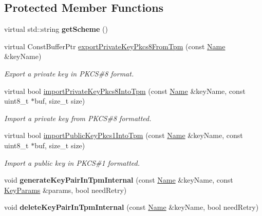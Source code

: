 \subsection*{Protected Member Functions}
\begin{DoxyCompactItemize}
\item 
virtual std\+::string {\bfseries get\+Scheme} ()\hypertarget{classndn_1_1SecTpmOsx_a24f2c8e178ccef7a8c184e01805c0d50}{}\label{classndn_1_1SecTpmOsx_a24f2c8e178ccef7a8c184e01805c0d50}

\item 
virtual Const\+Buffer\+Ptr \hyperlink{classndn_1_1SecTpmOsx_a67d10c57e20e7a9c1a29eb0d4693e897}{export\+Private\+Key\+Pkcs8\+From\+Tpm} (const \hyperlink{classndn_1_1Name}{Name} \&key\+Name)
\begin{DoxyCompactList}\small\item\em Export a private key in P\+K\+CS\#8 format. \end{DoxyCompactList}\item 
virtual bool \hyperlink{classndn_1_1SecTpmOsx_a19f29701b05f9948ccaf0b8f2a7c9a11}{import\+Private\+Key\+Pkcs8\+Into\+Tpm} (const \hyperlink{classndn_1_1Name}{Name} \&key\+Name, const uint8\+\_\+t $\ast$buf, size\+\_\+t size)
\begin{DoxyCompactList}\small\item\em Import a private key from P\+K\+CS\#8 formatted. \end{DoxyCompactList}\item 
virtual bool \hyperlink{classndn_1_1SecTpmOsx_a273d79ab55da77a1adb1697ed9689d78}{import\+Public\+Key\+Pkcs1\+Into\+Tpm} (const \hyperlink{classndn_1_1Name}{Name} \&key\+Name, const uint8\+\_\+t $\ast$buf, size\+\_\+t size)
\begin{DoxyCompactList}\small\item\em Import a public key in P\+K\+CS\#1 formatted. \end{DoxyCompactList}\item 
void {\bfseries generate\+Key\+Pair\+In\+Tpm\+Internal} (const \hyperlink{classndn_1_1Name}{Name} \&key\+Name, const \hyperlink{classndn_1_1KeyParams}{Key\+Params} \&params, bool need\+Retry)\hypertarget{classndn_1_1SecTpmOsx_ac50b9310692e418120c1e567905c8f9b}{}\label{classndn_1_1SecTpmOsx_ac50b9310692e418120c1e567905c8f9b}

\item 
void {\bfseries delete\+Key\+Pair\+In\+Tpm\+Internal} (const \hyperlink{classndn_1_1Name}{Name} \&key\+Name, bool need\+Retry)\hypertarget{classndn_1_1SecTpmOsx_a24ce32b05efc28cfae0827715efc9c2c}{}\label{classndn_1_1SecTpmOsx_a24ce32b05efc28cfae0827715efc9c2c}


\end{DoxyCompactItemize}
